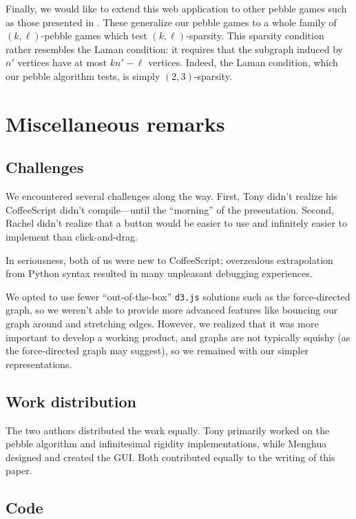 \documentclass[aps,prd,final,twocolumn,letterpaper,nofootinbib]{revtex4-1}
\begin{document}
Finally, we would like to extend this web application to other pebble games
such as those presented in \cite{lee08}.
These generalize our pebble games to a whole family of $(k,\ell)$-pebble games
which test $(k,\ell)$-sparsity.
This sparsity condition rather resembles the Laman condition:
it requires that the subgraph induced by $n'$ vertices have at most $kn' - \ell$ vertices.
Indeed, the Laman condition, which our pebble algorithm tests,
is simply $(2,3)$-sparsity.


\appendix*
\section{Miscellaneous remarks}

\subsection{Challenges}

We encountered several challenges along the way.
First, Tony didn't realize his CoffeeScript didn't compile---until the ``morning''
of the presentation.
Second, Rachel didn't realize that a button would be easier to use
and infinitely easier to implement than click-and-drag.

In seriousness, both of us were new to CoffeeScript;
overzealous extrapolation from Python syntax resulted
in many unpleasant debugging experiences.

We opted to use fewer ``out-of-the-box'' \texttt{d3.js} solutions such as
the force-directed graph, so we weren't able to provide more advanced features
like bouncing our graph around and stretching edges.
However, we realized that it was more important to develop a working product,
and graphs are not typically squishy (as the force-directed graph may suggest),
so we remained with our simpler representations.

\subsection{Work distribution}

The two authors distributed the work equally.
Tony primarily worked on the pebble algorithm and infinitesimal rigidity implementations,
while Menghua designed and created the GUI.
Both contributed equally to the writing of this paper.

\subsection{Code}
\end{document}
